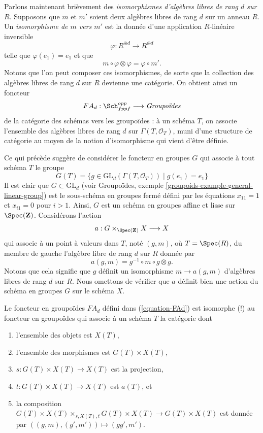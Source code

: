 \medskip\noindent
Parlons maintenant brièvement des {\it isomorphismes d'algèbres libres de rang $d$
sur $R$}. Supposons que $m$ et $m'$ soient deux algèbres libres de rang $d$
sur un anneau $R$. Un {\it isomorphisme de $m$ vers $m'$} est la donnée d'une
application $R$-linéaire inversible
$$
\varphi : R^{\oplus d} \longrightarrow R^{\oplus d}
$$
telle que $\varphi(e_1) = e_1$ et que
$$
m \circ \varphi \otimes \varphi = \varphi \circ m'.
$$
Notons que l'on peut composer ces isomorphismes, de sorte que la collection des
algèbres libres de rang $d$ sur $R$ devienne une catégorie.
On obtient ainsi un foncteur
\begin{equation}
\label{equation-FAd}
FA_d : \Sch_{fppf}^{opp} \longrightarrow \textit{Groupoïdes}
\end{equation}
de la catégorie des schémas vers les groupoïdes : à un schéma $T$, on associe
l'ensemble des algèbres libres de rang $d$ sur $\Gamma(T, \mathcal{O}_T)$,
muni d'une structure
de catégorie au moyen de la notion d'isomorphisme qui vient d'être définie.

\medskip\noindent
Ce qui précède suggère de considérer le foncteur en groupes $G$
qui associe à tout schéma $T$ le groupe
$$
G(T) = \{g \in \text{GL}_d(\Gamma(T, \mathcal{O}_T)) \mid g(e_1) = e_1\}
$$
Il est clair que $G \subset \text{GL}_d$ (voir
Groupoïdes, exemple \ref{groupoids-example-general-linear-group})
est le sous-schéma en groupes fermé défini par les équations
$x_{11} = 1$ et $x_{i1} = 0$ pour $i > 1$. Ainsi, $G$ est un
schéma en groupes affine et lisse sur $\Spec(\mathbf{Z})$. Considérons
l'action
$$
a : G \times_{\Spec(\mathbf{Z})} X \longrightarrow X
$$
qui associe à un point à valeurs dans $T$, noté $(g, m)$, où $T = \Spec(R)$,
du membre de gauche l'algèbre libre de rang $d$ sur $R$
donnée par
$$
a(g, m) = g^{-1} \circ m \circ g \otimes g.
$$
Notons que cela signifie que $g$ définit un isomorphisme $m \to a(g, m)$
d'algèbres libres de rang $d$ sur $R$. Nous omettons de vérifier que
$a$ définit bien une action du schéma en groupes $G$ sur le schéma $X$.

\begin{lemma}
\label{lemma-represent-FAd}
Le foncteur en groupoïdes $FA_d$ défini dans (\ref{equation-FAd})
est isomorphe (!) au foncteur en groupoïdes qui associe
à un schéma $T$ la catégorie dont
\begin{enumerate}
\item l'ensemble des objets est $X(T)$,
\item l'ensemble des morphismes est $G(T) \times X(T)$,
\item $s : G(T) \times X(T) \to X(T)$ est la projection,
\item $t : G(T) \times X(T) \to X(T)$ est $a(T)$, et
\item la composition $G(T) \times X(T) \times_{s, X(T), t} G(T) \times X(T)
\to G(T) \times X(T)$ est donnée par $((g, m), (g', m')) \mapsto (gg', m')$.
\end{enumerate}
\end{lemma}

